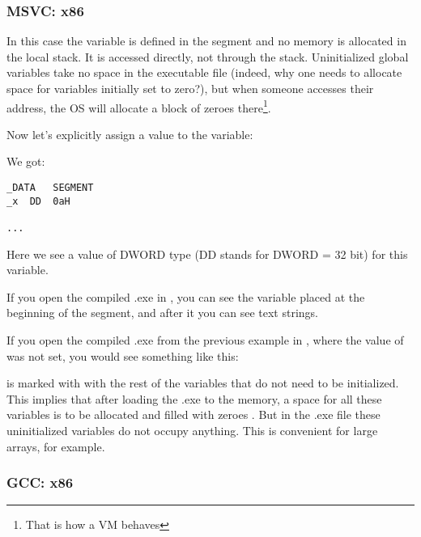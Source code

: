 \subsubsection{MSVC: x86}



In this case the  variable is defined in the  segment and no memory is allocated in the local stack. It is accessed directly, not through the stack. 
Uninitialized global variables take no space in the executable file
(indeed, why one needs to allocate space for variables initially set to zero?), 
but when someone accesses their address, 
the \ac{OS} will allocate a block of zeroes there\footnote{That is how a \ac{VM} behaves}.

Now let's explicitly assign a value to the variable:



We got:

\begin{lstlisting}
_DATA	SEGMENT
_x	DD	0aH

...
\end{lstlisting}

Here we see a value  of DWORD type (DD stands for DWORD = 32 bit) for this variable.

If you open the compiled .exe in \IDA, you can see the  variable placed at the beginning of 
the  segment, and after it you can see text strings.

If you open the compiled .exe from the previous example in \IDA, where the value of  was not set, you would see something like this:



 is marked with  with the rest of the variables that do not need to be initialized. 
This implies that after loading the .exe to the memory, a space for all these variables is to be 
allocated and filled with zeroes .
But in the .exe file these uninitialized variables do not occupy anything.
This is convenient for large arrays, for example.



\subsubsection{GCC: x86}

